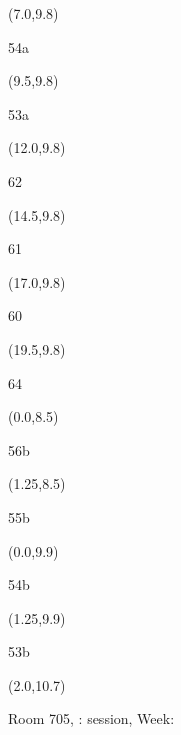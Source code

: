 \documentclass[a4paper]{article}
\newcommand{\myseat}[5]{%
\vspace{-0.1cm} \hspace{-0.5cm}
\parbox[t][2.2cm][t]{3.5cm}{%
\small #1 %
\begin{description}
\vspace{-0.1cm}
\item [ID:] #2
\vspace{-0.1cm}
\item [Team:] #3 \normalsize
\vspace{-0.1cm}
\item \normalsize #4 #5
\vspace{-0.1cm}
\end{description}
}
}
\begin{document}
\begin{CJK}{UTF8}{cyberbit}
\begin{textblock}{2.5}(7.0,9.8)
\textblockcolor{}
\myseat{54a}{}{}{}{}
\end{textblock}

\begin{textblock}{2.5}(9.5,9.8)
\textblockcolor{}
\myseat{53a}{}{}{}{}
\end{textblock}

\begin{textblock}{2.5}(12.0,9.8)
\textblockcolor{}
\myseat{62}{}{}{}{}
\end{textblock}

\begin{textblock}{2.5}(14.5,9.8)
\textblockcolor{}
\myseat{61}{}{}{}{}
\end{textblock}

\begin{textblock}{2.5}(17.0,9.8)
\textblockcolor{}
\myseat{60}{}{}{}{}
\end{textblock}

\begin{textblock}{2.5}(19.5,9.8)
\textblockcolor{}
\myseat{64}{}{}{}{}
\end{textblock}


\begin{textblock}{1.25}(0.0,8.5)
\textblockcolor{}
\myseat{56b}{}{}{}{}
\end{textblock}

\begin{textblock}{1.25}(1.25,8.5)
\textblockcolor{}
\myseat{55b}{}{}{}{}
\end{textblock}

\begin{textblock}{1.25}(0.0,9.9)
\textblockcolor{}
\myseat{54b}{}{}{}{}
\end{textblock}

\begin{textblock}{1.25}(1.25,9.9)
\textblockcolor{}
\myseat{53b}{}{}{}{}
\end{textblock}


\begin{textblock}{10}(2.0,10.7)
\textblockcolor{}
\parbox[t][2.2cm][t]{9.5cm}{%
\large Room 705, :  session, Week: 
\vspace{-0.3cm} \hspace{-0.5cm}
}
\end{textblock}

\end{CJK}
\end{document}
